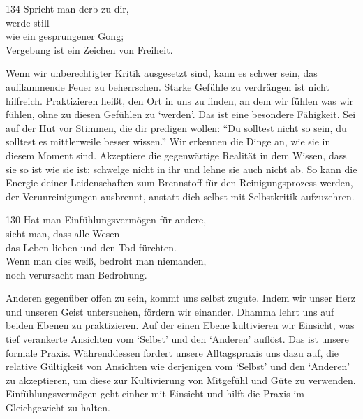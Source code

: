 
\begin{dhpVerse}{134}
\label{dhp-134}
Spricht man derb zu dir,\\ 
werde still\\ 
wie ein gesprungener Gong;\\ 
Vergebung ist ein Zeichen von Freiheit. 
\end{dhpVerse}

\begin{dhpRefl}

Wenn wir unberechtigter Kritik ausgesetzt sind, kann es schwer sein, das
aufflammende Feuer zu beherrschen. Starke Gefühle zu verdrängen ist nicht
hilfreich. Praktizieren heißt, den Ort in uns zu finden, an dem wir fühlen was
wir fühlen, ohne zu diesen Gefühlen zu `werden'. Das ist eine besondere
Fähigkeit. Sei auf der Hut vor Stimmen, die dir predigen wollen: “Du solltest
nicht so sein, du solltest es mittlerweile besser wissen.” Wir erkennen die
Dinge an, wie sie in diesem Moment sind. Akzeptiere die gegenwärtige Realität
in dem Wissen, dass sie so ist wie sie ist; schwelge nicht in ihr und lehne
sie auch nicht ab. So kann die Energie deiner Leidenschaften zum Brennstoff
für den Reinigungsprozess werden, der Verunreinigungen ausbrennt, anstatt dich
selbst mit Selbstkritik aufzuzehren.

\end{dhpRefl}


\begin{dhpVerse}{130}
\label{dhp-130}
Hat man Einfühlungsvermögen für andere,\\ 
sieht man, dass alle Wesen\\ 
das Leben lieben und den Tod fürchten.\\ 
Wenn man dies weiß, bedroht man niemanden,\\ 
noch verursacht man Bedrohung. 
\end{dhpVerse}

\begin{dhpRefl}

Anderen gegenüber offen zu sein, kommt uns selbst zugute. Indem wir unser Herz
und unseren Geist untersuchen, fördern wir einander. Dhamma lehrt uns auf
beiden Ebenen zu praktizieren. Auf der einen Ebene kultivieren wir Einsicht,
was tief verankerte Ansichten vom `Selbst' und den `Anderen' auflöst. Das ist
unsere formale Praxis. Währenddessen fordert unsere Alltagspraxis uns dazu
auf, die relative Gültigkeit von Ansichten wie derjenigen vom `Selbst' und den
`Anderen' zu akzeptieren, um diese zur Kultivierung von Mitgefühl und Güte zu
verwenden. Einfühlungsvermögen geht einher mit Einsicht und hilft die Praxis
im Gleichgewicht zu halten.

\end{dhpRefl}

